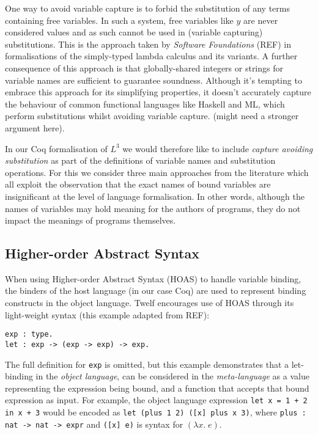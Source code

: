 \documentclass[]{unswthesis}
\begin{document}
One way to avoid variable capture is to forbid the substitution of any terms containing free variables. In such a system, free variables like $y$ are never considered values and as such cannot be used in (variable capturing) substitutions. This is the approach taken by \textit{Software Foundations} (REF) in formalisations of the simply-typed lambda calculus and its variants. A further consequence of this approach is that globally-shared integers or strings for variable names are sufficient to guarantee soundness. Although it's tempting to embrace this approach for its simplifying properties, it doesn't accurately capture the behaviour of common functional languages like Haskell and ML, which perform substitutions whilst avoiding variable capture. (might need a stronger argument here).

In our Coq formalisation of $L^3$ we would therefore like to include \textit{capture avoiding substitution} as part of the definitions of variable names and substitution operations. For this we consider three main approaches from the literature which all exploit the observation that the exact names of bound variables are insignificant at the level of language formalisation. In other words, although the names of variables may hold meaning for the authors of programs, they do not impact the meanings of programs themselves.

\subsection{Higher-order Abstract Syntax}

When using Higher-order Abstract Syntax (HOAS) to handle variable binding, the binders of the host language (in our case Coq) are used to represent binding constructs in the object language. Twelf encourages use of HOAS through its light-weight syntax (this example adapted from REF):

\begin{verbatim}
exp : type.
let : exp -> (exp -> exp) -> exp.
\end{verbatim}

The full definition for \texttt{exp} is omitted, but this example demonstrates that a let-binding in the \textit{object language}, can be considered in the \textit{meta-language} as a value representing the expression being bound, and a function that accepts that bound expression as input. For example, the object language expression \texttt{let x = 1 + 2 in x + 3} would be encoded as \texttt{let (plus 1 2) ([x] plus x 3)}, where \texttt{plus : nat -> nat -> expr} and \texttt{([x] e)} is syntax for $(\lambda x. \; e)$.
\end{document}

